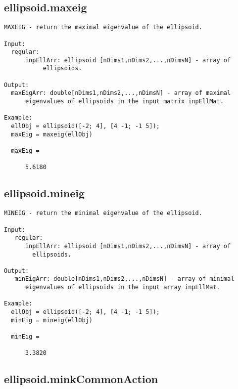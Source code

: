 \subsection{\texorpdfstring{ellipsoid.maxeig}{maxeig}}\label{method:ellipsoid.maxeig}
\begin{verbatim}
MAXEIG - return the maximal eigenvalue of the ellipsoid.

Input:
  regular:
      inpEllArr: ellipsoid [nDims1,nDims2,...,nDimsN] - array of
           ellipsoids.

Output:
  maxEigArr: double[nDims1,nDims2,...,nDimsN] - array of maximal
      eigenvalues of ellipsoids in the input matrix inpEllMat.

Example:
  ellObj = ellipsoid([-2; 4], [4 -1; -1 5]);
  maxEig = maxeig(ellObj)

  maxEig =

      5.6180
\end{verbatim}
\subsection{\texorpdfstring{ellipsoid.mineig}{mineig}}\label{method:ellipsoid.mineig}
\begin{verbatim}
MINEIG - return the minimal eigenvalue of the ellipsoid.

Input:
   regular:
      inpEllArr: ellipsoid [nDims1,nDims2,...,nDimsN] - array of
        ellipsoids.

Output:
   minEigArr: double[nDims1,nDims2,...,nDimsN] - array of minimal
      eigenvalues of ellipsoids in the input array inpEllMat.

Example:
  ellObj = ellipsoid([-2; 4], [4 -1; -1 5]);
  minEig = mineig(ellObj)

  minEig =

      3.3820
\end{verbatim}
\subsection{\texorpdfstring{ellipsoid.minkCommonAction}{minkCommonAction}}\label{method:ellipsoid.minkCommonAction}
\begin{verbatim}

\end{verbatim}
